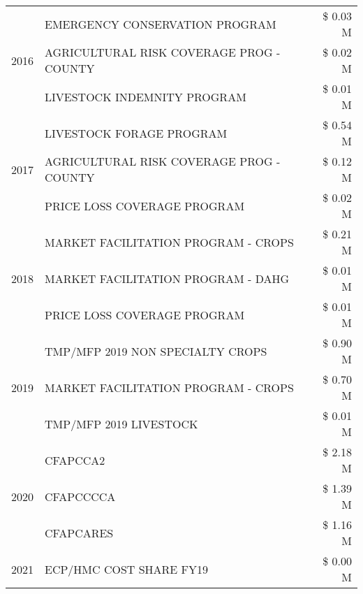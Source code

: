 \begin{tabular}{llr}
\cline{1-3}
\multirow[t]{3}{*}{2016} & EMERGENCY CONSERVATION PROGRAM & \$ 0.03 M \\
 & AGRICULTURAL RISK COVERAGE PROG - COUNTY & \$ 0.02 M \\
 & LIVESTOCK INDEMNITY PROGRAM & \$ 0.01 M \\
\cline{1-3}
\multirow[t]{3}{*}{2017} & LIVESTOCK FORAGE PROGRAM & \$ 0.54 M \\
 & AGRICULTURAL RISK COVERAGE PROG - COUNTY & \$ 0.12 M \\
 & PRICE LOSS COVERAGE PROGRAM & \$ 0.02 M \\
\cline{1-3}
\multirow[t]{3}{*}{2018} & MARKET FACILITATION PROGRAM - CROPS & \$ 0.21 M \\
 & MARKET FACILITATION PROGRAM - DAHG & \$ 0.01 M \\
 & PRICE LOSS COVERAGE PROGRAM & \$ 0.01 M \\
\cline{1-3}
\multirow[t]{3}{*}{2019} & TMP/MFP 2019 NON SPECIALTY CROPS & \$ 0.90 M \\
 & MARKET FACILITATION PROGRAM - CROPS & \$ 0.70 M \\
 & TMP/MFP 2019 LIVESTOCK & \$ 0.01 M \\
\cline{1-3}
\multirow[t]{3}{*}{2020} & CFAPCCA2 & \$ 2.18 M \\
 & CFAPCCCCA & \$ 1.39 M \\
 & CFAPCARES & \$ 1.16 M \\
\cline{1-3}
2021 & ECP/HMC COST SHARE FY19 & \$ 0.00 M \\
\cline{1-3}
\bottomrule
\end{tabular}
